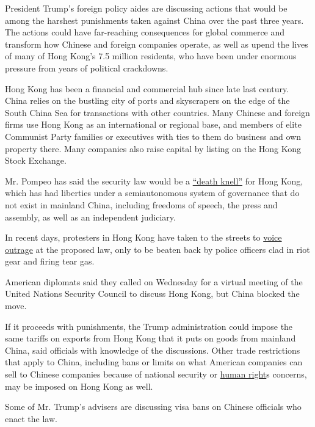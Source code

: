 President Trump's foreign policy aides are discussing actions that would
be among the harshest punishments taken against China over the past
three years. The actions could have far-reaching consequences for global
commerce and transform how Chinese and foreign companies operate, as
well as upend the lives of many of Hong Kong's 7.5 million residents,
who have been under enormous pressure from years of political
crackdowns.

Hong Kong has been a financial and commercial hub since late last
century. China relies on the bustling city of ports and skyscrapers on
the edge of the South China Sea for transactions with other countries.
Many Chinese and foreign firms use Hong Kong as an international or
regional base, and members of elite Communist Party families or
executives with ties to them do business and own property there. Many
companies also raise capital by listing on the Hong Kong Stock Exchange.

Mr. Pompeo has said the security law would be a
\href{https://www.nytimes3xbfgragh.onion/2020/05/22/world/asia/trump-pompeo-china-hong-kong.html}{``death
knell''} for Hong Kong, which has had liberties under a semiautonomous
system of governance that do not exist in mainland China, including
freedoms of speech, the press and assembly, as well as an independent
judiciary.

In recent days, protesters in Hong Kong have taken to the streets to
\href{https://www.nytimes3xbfgragh.onion/2020/05/27/world/asia/hong-kong-protest-china-anthem.html}{voice
outrage} at the proposed law, only to be beaten back by police officers
clad in riot gear and firing tear gas.

American diplomats said they called on Wednesday for a virtual meeting
of the United Nations Security Council to discuss Hong Kong, but China
blocked the move.

If it proceeds with punishments, the Trump administration could impose
the same tariffs on exports from Hong Kong that it puts on goods from
mainland China, said officials with knowledge of the discussions. Other
trade restrictions that apply to China, including bans or limits on what
American companies can sell to Chinese companies because of national
security or
\href{https://www.nytimes3xbfgragh.onion/2020/06/23/us/politics/pompeo-state-human-rights.html}{human
right}s concerns, may be imposed on Hong Kong as well.

Some of Mr. Trump's advisers are discussing visa bans on Chinese
officials who enact the law.

